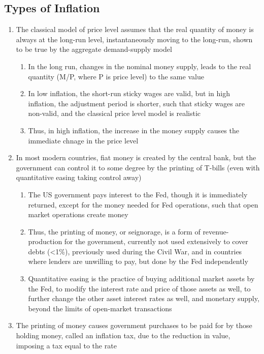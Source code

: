 \documentclass[11 pt, twoside]{article}
\begin{document}
\subsection{Types of Inflation}
\begin{enumerate}
\item The classical model of price level assumes that the real quantity of money is always at the long-run level, instantaneously moving to the long-run, shown to be true by the aggregate demand-supply model
\begin{enumerate}
\item In the long run, changes in the nominal money supply, leads to the real quantity (M/P, where P is price level) to the same value
\item In low inflation, the short-run sticky wages are valid, but in high inflation, the adjustment period is shorter, such that sticky wages are non-valid, and the classical price level model is realistic
\item Thus, in high inflation, the increase in the money supply causes the immediate chnage in the price level
\end{enumerate}
\item In most modern countries, fiat money is created by the central bank, but the government can control it to some degree by the printing of T-bills (even with quantitative easing taking control away)
\begin{enumerate}
\item The US government pays interest to the Fed, though it is immediately returned, except for the money needed for Fed operations, such that open market operations create money
\item Thus, the printing of money, or seignorage, is a form of revenue-production for the government, currently not used extensively to cover debts (<1\%), previously used during the Civil War, and in countries where lenders are unwilling to pay, but done by the Fed independently
\item Quantitative easing is the practice of buying additional market assets by the Fed, to modify the interest rate and price of those assets as well, to further change the other asset interest rates as well, and monetary supply, beyond the limits of open-market transactions
\end{enumerate}
\item The printing of money causes government purchases to be paid for by those holding money, called an inflation tax, due to the reduction in value, imposing a tax equal to the rate

\end{enumerate}
\end{document}
